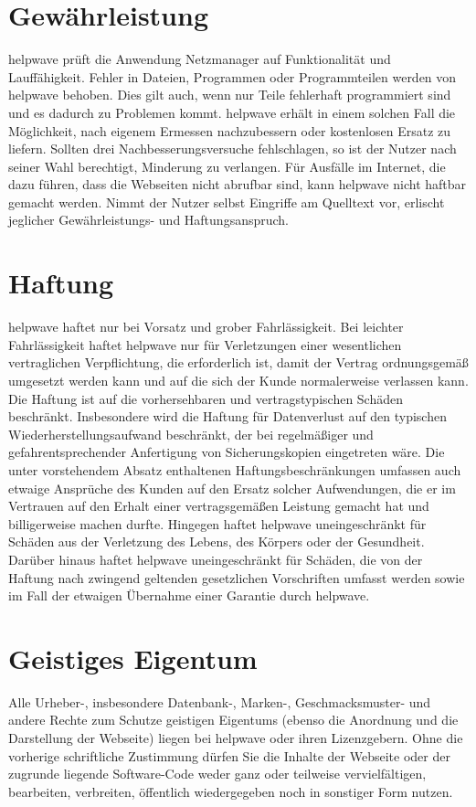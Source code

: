 \documentclass[10pt]{article}
\begin{document}
\section{Gewährleistung}
helpwave prüft die Anwendung Netzmanager auf Funktionalität und Lauffähigkeit. Fehler in Dateien, Programmen oder Programmteilen werden von helpwave behoben. Dies gilt auch, wenn nur Teile fehlerhaft programmiert sind und es dadurch zu
Problemen kommt. helpwave erhält in einem solchen Fall die Möglichkeit, nach eigenem Ermessen nachzubessern oder kostenlosen Ersatz zu liefern. Sollten drei Nachbesserungsversuche fehlschlagen, so ist der Nutzer nach seiner Wahl berechtigt,
Minderung zu verlangen. Für Ausfälle im Internet, die dazu führen, dass die Webseiten nicht abrufbar sind, kann helpwave
nicht haftbar gemacht werden. Nimmt der Nutzer selbst Eingriffe am Quelltext vor, erlischt jeglicher Gewährleistungs- und
Haftungsanspruch.
\section{Haftung}
helpwave haftet nur bei Vorsatz und grober Fahrlässigkeit. Bei leichter Fahrlässigkeit haftet helpwave nur für Verletzungen
einer wesentlichen vertraglichen Verpflichtung, die erforderlich ist, damit der Vertrag ordnungsgemäß umgesetzt werden
kann und auf die sich der Kunde normalerweise verlassen kann. Die Haftung ist auf die vorhersehbaren und vertragstypischen Schäden beschränkt. Insbesondere wird die Haftung für Datenverlust auf den typischen Wiederherstellungsaufwand
beschränkt, der bei regelmäßiger und gefahrentsprechender Anfertigung von Sicherungskopien eingetreten wäre.
Die unter vorstehendem Absatz enthaltenen Haftungsbeschränkungen umfassen auch etwaige Ansprüche des Kunden auf
den Ersatz solcher Aufwendungen, die er im Vertrauen auf den Erhalt einer vertragsgemäßen Leistung gemacht hat und
billigerweise machen durfte.
Hingegen haftet helpwave uneingeschränkt für Schäden aus der Verletzung des Lebens, des Körpers oder der Gesundheit.
Darüber hinaus haftet helpwave uneingeschränkt für Schäden, die von der Haftung nach zwingend geltenden gesetzlichen
Vorschriften umfasst werden sowie im Fall der etwaigen Übernahme einer Garantie durch helpwave.
\section{Geistiges Eigentum}
Alle Urheber-, insbesondere Datenbank-, Marken-, Geschmacksmuster- und andere Rechte zum Schutze geistigen Eigentums
(ebenso die Anordnung und die Darstellung der Webseite) liegen bei helpwave oder ihren Lizenzgebern. Ohne die vorherige
schriftliche Zustimmung dürfen Sie die Inhalte der Webseite oder der zugrunde liegende Software-Code weder ganz oder
teilweise vervielfältigen, bearbeiten, verbreiten, öffentlich wiedergegeben noch in sonstiger Form nutzen.
\end{document}
